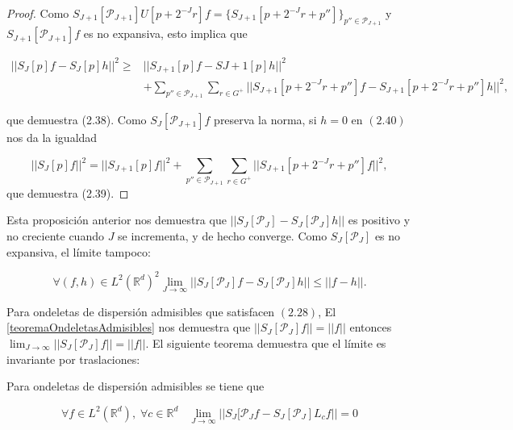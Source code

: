 \begin{proof}
\noindent Como $S_{J+1}[\mathcal{P}_{J+1}]U[p+2^{-J}r]f=\lbrace S_{J+1} [p+2^{-J}r+p'']\rbrace_{p''\in\mathcal{P}_{J+1}}$  y $S_{J+1}[\mathcal{P}_{J+1}]f$ es no expansiva, esto implica que

\begin{align*}
    ||S_{J}[p]f - S_J[p]h||^2 \geq & ||S_{J+1}[p]f-S{J+1}[p]h||^2 \\
    & + \sum_{p''\in \mathcal{P}_{J+1}} \sum_{r\in G^+} || S_{J+1}[p+2^{-J}r+p'']f- S_{J+1}[p+2^{-J}r+p'']h||^2,
\end{align*}

\noindent que demuestra (2.38). Como $S_{J}[\mathcal{P}_{J+1}]f$ preserva la norma, si $h=0$ en $(2.40)$ nos da la igualdad

$$||S_J[p]f||^2=||S_{J+1}[p]f||^2 + \sum_{p''\in \mathcal{P}_{J+1}}\sum_{r\in G^+}||S_{J+1}[p+2^{-J}r+p'']f||^2,$$
\noindent que demuestra (2.39). \qedhere
\end{proof}

\medskip

\noindent Esta proposición anterior nos demuestra que $||S_J[\mathcal{P}_J]-S_J[\mathcal{P}_J]h||$ es positivo y no creciente cuando $J$ se incrementa, y de hecho converge. Como $S_J[\mathcal{P}_J]$ es no expansiva, el límite tampoco: 

$$\forall (f,h)\in L^2(\mathbb{R}^d)^2 \lim_{J\rightarrow\infty} ||S_J[\mathcal{P}_J]f-S_{J}[\mathcal{P}_J]h|| \leq ||f-h||.$$

\medskip

\noindent Para ondeletas de dispersión admisibles que satisfacen $(2.28)$, El \autoref{teoremaOndeletasAdmisibles} nos demuestra que $||S_J[\mathcal{P}_J]f||=||f||$ entonces $\lim_{J\rightarrow\infty}||S_J[\mathcal{P}_J]f||=||f||$. El siguiente teorema demuestra que el límite es invariante por traslaciones: 

\begin{teorema} \label{invarianzaTraslaciones}
Para ondeletas de dispersión admisibles se tiene que 

$$\forall f \in L^2(\mathbb{R}^d), \; \forall c\in \mathbb{R}^d \;\;\; \lim_{J\rightarrow \infty}||S_J[\mathcal{P}_J f-S_J[\mathcal{P}_J] L_cf||=0$$
\end{teorema}


